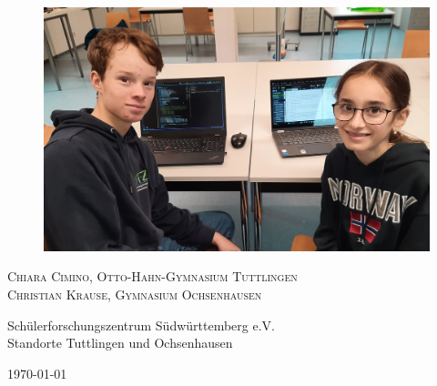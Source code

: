 \documentclass[10pt]{article}
\begin{document}
\vspace{0.4cm}
\begin{figure}[ht]

    \centering

    \includegraphics[scale=0.1]{Bild Christian Chiara bearbeitet.jpg}

\end{figure}
 \begin{center}

 
     \Large\textsc{Chiara Cimino, Otto-Hahn-Gymnasium Tuttlingen\\Christian Krause, Gymnasium Ochsenhausen}\\\vspace{1cm}

    Schülerforschungszentrum Südwürttemberg e.V.\\Standorte Tuttlingen und Ochsenhausen  \vspace{1.5cm}

     \today

 \end{center}~
 \clearpage
 
\tableofcontents
\listoffigures
\thispagestyle{empty}
\end{document}
